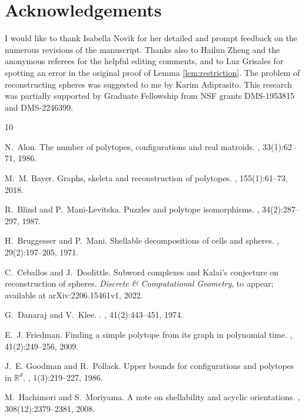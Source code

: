 \documentclass[11pt,twoside]{article}
\theoremstyle{definition}
\begin{document}
\section*{Acknowledgements}
I would like to thank Isabella Novik for her detailed and prompt feedback on the numerous revisions of the manuscript. Thanks also to Hailun Zheng and the anonymous referees for the helpful editing comments, and to Luz Grisales for spotting an error in the original proof of Lemma \ref{lem:restriction}. The problem of reconstructing spheres was suggested to me by Karim Adiprasito. This research was partially supported by Graduate Fellowship from NSF grants DMS-1953815 and DMS-2246399. 


\begin{thebibliography}{10}

N.~Alon.
\newblock The number of polytopes, configurations and real matroids.
, 33(1):62--71, 1986.

M.~M. Bayer.
\newblock Graphs, skeleta and reconstruction of polytopes.
, 155(1):61--73, 2018.

R.~Blind and P.~Mani-Levitska.
\newblock Puzzles and polytope isomorphisms.
, 34(2):287--297, 1987.

H.~Bruggesser and P.~Mani.
\newblock Shellable decompositions of cells and spheres.
, 29(2):197--205, 1971.

C.~Ceballos and J.~Doolittle.
\newblock Subword complexes and {Kalai}'s conjecture on reconstruction of spheres.
\newblock \emph{Discrete \& Computational Geometry}, to appear; available at arXiv:2206.15461v1, 2022.

G.~Danaraj and V.~Klee.
.
, 41(2):443--451, 1974.

E.~J. Friedman.
\newblock Finding a simple polytope from its graph in polynomial time.
, 41(2):249--256, 2009.

J.~E. Goodman and R.~Pollack.
\newblock Upper bounds for configurations and polytopes in $\mathbb{R}^d$.
, 1(3):219--227, 1986.

M.~Hachimori and S.~Moriyama.
\newblock A note on shellability and acyclic orientations.
, 308(12):2379--2381, 2008.


\end{thebibliography}
\end{document}
